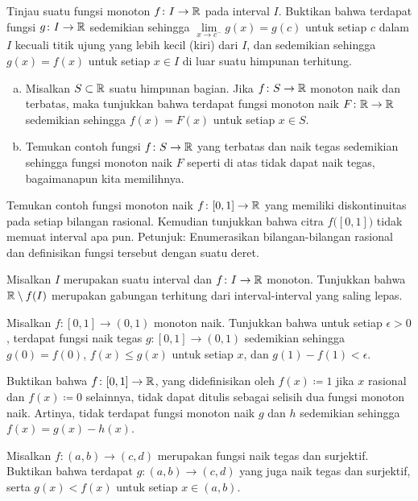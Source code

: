 \begin{exercise}
Tinjau suatu fungsi monoton $f \colon I \to {\mathbb{R}}$ pada interval $I$.  Buktikan bahwa terdapat
fungsi $g \colon I \to {\mathbb{R}}$ sedemikian sehingga
$\lim\limits_{x \to c^-} g(x) = g(c)$ untuk setiap $c$ dalam $I$ kecuali
titik ujung yang lebih kecil (kiri) dari $I$, dan sedemikian sehingga
$g(x) = f(x)$ untuk setiap $x \in I$ di luar suatu himpunan terhitung.
\end{exercise}

\begin{exercise}
\leavevmode
\begin{enumerate}[a)]
\item
Misalkan $S \subset {\mathbb{R}}$ suatu himpunan bagian.  Jika $f \colon S \to {\mathbb{R}}$ monoton naik dan
terbatas,
maka tunjukkan bahwa terdapat fungsi monoton naik $F \colon {\mathbb{R}} \to {\mathbb{R}}$
sedemikian sehingga $f(x) = F(x)$ untuk setiap $x \in S$.
\item
Temukan contoh fungsi $f \colon S \to {\mathbb{R}}$ yang terbatas dan naik tegas sedemikian sehingga
fungsi monoton naik $F$ seperti di atas tidak dapat naik tegas, bagaimanapun kita
memilihnya.
\end{enumerate}
\end{exercise}

\begin{exercise}[Menantang] \label{exercise:increasingfuncdiscatQ}
Temukan contoh fungsi monoton naik $f \colon [0,1] \to {\mathbb{R}}$
yang memiliki diskontinuitas pada setiap bilangan rasional.  Kemudian tunjukkan bahwa citra
$f\bigl([0,1]\bigr)$ tidak memuat interval apa pun.  Petunjuk: Enumerasikan
bilangan-bilangan rasional dan definisikan
fungsi tersebut dengan suatu deret.
\end{exercise}

\begin{exercise}
Misalkan $I$ merupakan suatu interval dan $f \colon I \to {\mathbb{R}}$ monoton.
Tunjukkan bahwa ${\mathbb{R}} \setminus f(I)$ merupakan gabungan terhitung dari interval-interval yang saling lepas.
\end{exercise}

\begin{exercise}
Misalkan $f \colon [0,1] \to (0,1)$ monoton naik.  Tunjukkan bahwa untuk setiap
$\epsilon > 0$, terdapat
fungsi naik tegas $g \colon [0,1] \to (0,1)$ sedemikian sehingga
$g(0) = f(0)$, $f(x) \leq g(x)$ untuk setiap $x$, dan $g(1)-f(1) < \epsilon$.
\end{exercise}

\begin{exercise}
Buktikan bahwa 
$f \colon [0,1] \to{\mathbb{R}}$, yang didefinisikan oleh $f(x) \coloneqq 1$
jika $x$ rasional dan $f(x) \coloneqq 0$ selainnya, tidak dapat ditulis sebagai
selisih dua fungsi monoton naik.  Artinya, tidak terdapat fungsi monoton naik
$g$ dan $h$ sedemikian sehingga $f(x) = g(x) - h(x)$.
\end{exercise}

\begin{exercise}
Misalkan $f \colon (a,b) \to (c,d)$ merupakan fungsi naik tegas
dan surjektif.  Buktikan bahwa terdapat $g \colon (a,b) \to (c,d)$
yang juga naik tegas dan surjektif, serta $g(x) < f(x)$ untuk setiap $x \in
(a,b)$.
\end{exercise}
